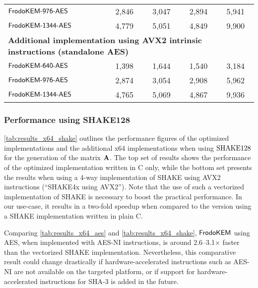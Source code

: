 \documentclass{iacrcc}
\begin{document}
\begin{table}[t]
\begin{tabular}{l|c c c|c}
$\textsf{\upshape\mdseries FrodoKEM-976-AES}$                             &            2,846                &            3,047                   &                2,894       &                5,941             \\
$\textsf{\upshape\mdseries FrodoKEM-1344-AES}$                             &            4,779                &            5,051                   &                 4,849       &                 9,900             \\
\midrule
\multicolumn{5}{l}{\bf Additional implementation using AVX2 intrinsic instructions (standalone AES)} \\
\midrule
$\textsf{\upshape\mdseries FrodoKEM-640-AES}$                               &            1,398                &            1,644                   &                 1,540       &                3,184             \\
$\textsf{\upshape\mdseries FrodoKEM-976-AES}$                             &            2,874                &            3,054                   &                 2,908       &                5,962             \\
$\textsf{\upshape\mdseries FrodoKEM-1344-AES}$                             &            4,765                &            5,069                   &                 4,867       &                9,936             \\
\bottomrule
\end{tabular}
\end{table}


\subsubsection{Performance using SHAKE128}\label{sec:results_shake}

\autoref{tab:results_x64_shake} outlines the performance figures of the optimized implementations and the additional x64 implementations when using $\textrm{\upshape\mdseries SHAKE}128$ for the generation of the matrix $\mathbf{A}$. 
The top set of results shows the performance of the optimized implementation written in C only, while the bottom set presents the results when using a 4-way implementation of SHAKE using AVX2 instructions (``SHAKE4x using AVX2'').
Note that the use of such a vectorized implementation of SHAKE is necessary to boost the practical performance. In our use-case, it results in a two-fold speedup when compared to the version using a SHAKE implementation written in plain C.

Comparing \autoref{tab:results_x64_aes} and \autoref{tab:results_x64_shake}, $\textsf{\upshape\mdseries FrodoKEM}$ using AES, when implemented with AES-NI instructions, is around 2.6--3.1$\times$ faster than the vectorized SHAKE implementation. Nevertheless, this comparative result could change drastically if hardware-accelerated instructions such as AES-NI are not available on the targeted platform, or if support for hardware-accelerated instructions for SHA-3 is added in the future. 
\end{document}

